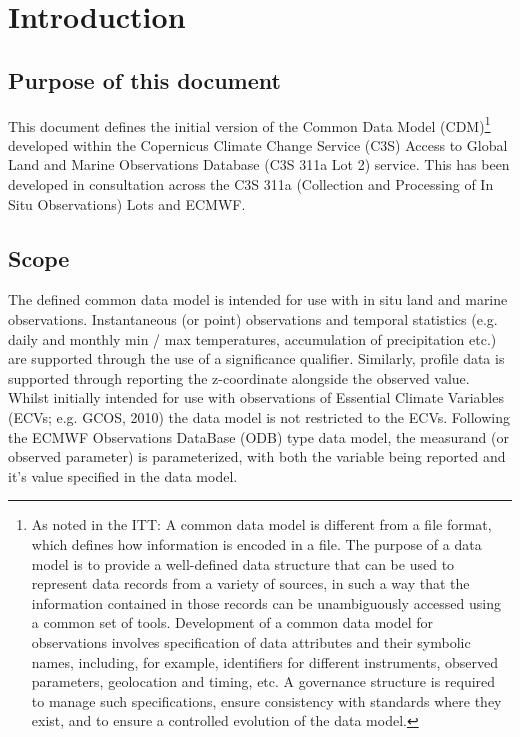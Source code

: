\documentclass[a4paper]{article}
\begin{document}
\newpage
\tableofcontents
\newpage
\listoftables
\newpage


\section {Introduction}

\subsection {Purpose of this document}
This document defines the initial version of the Common Data Model (CDM)\footnote{As noted in the ITT: A common data model is different from a file format, which defines how information is encoded in a file. The purpose of a data model is to provide a well-defined data structure that can be used to represent data records from a variety of sources, in such a way that the information contained in those records can be unambiguously accessed using a common set of tools. Development of a common data model for observations involves specification of data attributes and their symbolic names, including, for example, identifiers for different instruments, observed parameters, geolocation and timing, etc. A governance structure is required to manage such specifications, ensure consistency with standards where they exist, and to ensure a controlled evolution of the data model.} developed within the Copernicus Climate Change Service (C3S) Access to Global Land and Marine Observations Database (C3S 311a Lot 2) service. This has been developed in consultation across the C3S 311a (Collection and Processing of In Situ Observations) Lots and ECMWF.

\subsection {Scope}
The defined common data model is intended for use with in situ land and marine observations. Instantaneous (or point) observations and temporal statistics (e.g. daily and monthly min / max temperatures, accumulation of precipitation etc.)  are supported through the use of a significance qualifier. Similarly, profile data is supported through reporting the z-coordinate alongside the observed value.\\

Whilst initially intended for use with observations of Essential Climate Variables (ECVs; e.g. GCOS, 2010) the data model is not restricted to the ECVs. Following the ECMWF Observations DataBase (ODB) type data model, the measurand (or observed parameter) is parameterized, with both the variable being reported and it's value specified in the data model.\\
\end{document}
